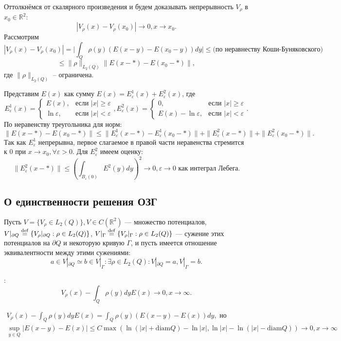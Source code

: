 \documentclass[a4paper, 12pt]{article}
\newcommand{\R}[1]{\mathbb{R}^#1}
\begin{document}
\begin{Proof}
  Оттолкнёмся от скалярного произведения и будем доказывать непрерывность $V_{\rho}$ в $x_0 \in \R{2}$:
$$|V_{\rho}(x)-V_{\rho}(x_0)| \rightarrow 0, x \rightarrow x_0.$$
Рассмотрим 
$$|V_{\rho}(x)-V_{\rho}(x_0)|=\biggl|\int_Q \rho(y) \left(E(x-y)-E(x_0-y) \right)dy\biggl| \leq \text{(по неравнеству Коши-Буняковского)}$$
$$\leq \| \rho\|_{L_2(Q)}\|E(x-*)-E(x_0-*)\|,$$
где $\| \rho\|_{L_2(Q)}$ -- ограничена. 

Представим $E(x)$ как сумму $E(x)= E^1_{\varepsilon} (x)+{E}^2_{\varepsilon}(x)$, где
\[
E^1_{\varepsilon}(x) =
\begin{cases}
E(x), & \text{если $|x|\geq \varepsilon$} \\
\ln \varepsilon, & \text{если $|x|<\varepsilon$}
\end{cases},
E^2_{\varepsilon}(x) =
\begin{cases}
0, & \text{если $|x|\geq \varepsilon$} \\
E(x)-\ln \varepsilon, & \text{если $|x|<\varepsilon$}
\end{cases}.
\]
По неравенству треугольника для норм:
$$\|E(x-*)-E(x_0-*)\| \leq \|E^1_{\varepsilon}(x-*)-E^1_{\varepsilon}(x_0-*)\|+\|E^2_{\varepsilon}(x-*)\|+\|E^2_{\varepsilon}(x_0-*)\|.$$
Так как $E^1_{\varepsilon}$ непрерывна, первое слагаемое в правой части неравенства стремится к 0 при $x \rightarrow x_0, \forall \varepsilon >0$.
Для $E^2_{\varepsilon}$ имеем оценку:
$$\| E^2_{\varepsilon}(x-*)\| \leq \left(\int_{B_{\varepsilon}(0)}E^2(y) dy \right)^2 \rightarrow 0, \varepsilon \rightarrow 0 \text{ как интеграл Лебега.}$$
\end{Proof}

\subsection{О единственности решения ОЗГ}
Пусть
$V = \{V_{\rho} \in L_2(Q)\}, V \in C(\R{2})$ --- множество потенциалов,
\def\MYdef{\mathrel{\stackrel{\rm def}=}}
$V|_{\partial Q}\MYdef \{V_{\rho}|_{\partial Q}: \rho \in L_2(Q)\}$,
$V|_{\Gamma} \MYdef \{V_{\rho}|_{\Gamma}: \rho \in L_2(Q)\}$ --- сужение этих потенциалов на $\partial Q$ и некоторую кривую $\Gamma$,
и пусть имеется отношение эквивалентности между этими сужениями:
$$a \in V|_{\partial Q} \simeq b \in V|_{\Gamma}: \exists \rho \in L_2(Q):V|_{\partial Q}=a,V|_{\Gamma}=b.$$

{}:
$$V_{\rho}(x)-\int_Q \rho(y) dy E(x) \rightarrow 0, x \rightarrow \infty.$$
\begin{Proof}
  \begin{multline*}
    V_{\rho}(x)-\int_Q \rho(y) dy E(x)=\int_Q \rho(y) (E(x-y)-E(x))dy, \text{ но}\\
     \sup_{y \in Q}|E(x-y)-E(x)| \leq C \max (\ln(|x|+\text{diam} Q)-\ln|x|,\ln|x|-\ln(|x|-\text{diam} Q)) \rightarrow 0, x \rightarrow \infty
\end{multline*}
\end{Proof}
\end{document}
